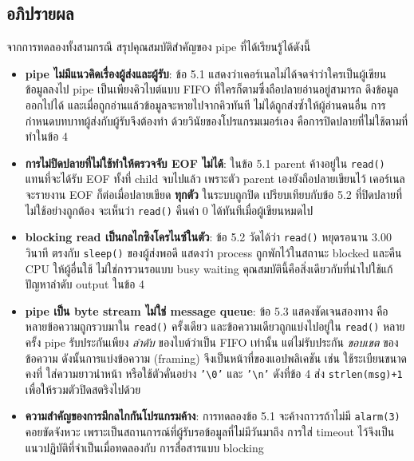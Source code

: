\documentclass[a4paper,12pt]{article}
\newcommand{\code}[1]{\texttt{#1}}
\begin{document}
\subsection{อภิปรายผล}

จากการทดลองทั้งสามกรณี สรุปคุณสมบัติสำคัญของ pipe ที่ได้เรียนรู้ได้ดังนี้

\begin{itemize}[leftmargin=*]
  \item \textbf{pipe ไม่มีแนวคิดเรื่องผู้ส่งและผู้รับ}:
        ข้อ 5.1 แสดงว่าเคอร์เนลไม่ได้จดจำว่าใครเป็นผู้เขียนข้อมูลลงไป
        pipe เป็นเพียงคิวไบต์แบบ FIFO ที่ใครก็ตามซึ่งถือปลายอ่านอยู่สามารถ
        ดึงข้อมูลออกไปได้ และเมื่อถูกอ่านแล้วข้อมูลจะหายไปจากคิวทันที
        ไม่ได้ถูกส่งซ้ำให้ผู้อ่านคนอื่น การกำหนดบทบาทผู้ส่งกับผู้รับจึงต้องทำ
        ด้วยวินัยของโปรแกรมเมอร์เอง คือการปิดปลายที่ไม่ใช้ตามที่ทำในข้อ 4

  \item \textbf{การไม่ปิดปลายที่ไม่ใช้ทำให้ตรวจจับ EOF ไม่ได้}:
        ในข้อ 5.1 parent ค้างอยู่ใน \code{read()} แทนที่จะได้รับ EOF
        ทั้งที่ child จบไปแล้ว เพราะตัว parent เองยังถือปลายเขียนไว้
        เคอร์เนลจะรายงาน EOF ก็ต่อเมื่อปลายเขียด \textbf{ทุกตัว} ในระบบถูกปิด
        เปรียบเทียบกับข้อ 5.2 ที่ปิดปลายที่ไม่ใช้อย่างถูกต้อง จะเห็นว่า
        \code{read()} คืนค่า 0 ได้ทันทีเมื่อผู้เขียนหมดไป

  \item \textbf{blocking read เป็นกลไกซิงโครไนซ์ในตัว}:
        ข้อ 5.2 วัดได้ว่า \code{read()} หยุดรอนาน 3.00 วินาที ตรงกับ
        \code{sleep()} ของผู้ส่งพอดี แสดงว่า process ถูกพักไว้ในสถานะ blocked
        และคืน CPU ให้ผู้อื่นใช้ ไม่ใช่การวนรอแบบ busy waiting
        คุณสมบัตินี้คือสิ่งเดียวกับที่นำไปใช้แก้ปัญหาลำดับ output ในข้อ 4

  \item \textbf{pipe เป็น byte stream ไม่ใช่ message queue}:
        ข้อ 5.3 แสดงชัดเจนสองทาง คือหลายข้อความถูกรวบมาใน \code{read()}
        ครั้งเดียว และข้อความเดียวถูกแบ่งไปอยู่ใน \code{read()} หลายครั้ง
        pipe รับประกันเพียง \emph{ลำดับ} ของไบต์ว่าเป็น FIFO เท่านั้น
        แต่ไม่รับประกัน \emph{ขอบเขต} ของข้อความ ดังนั้นการแบ่งข้อความ
        (framing) จึงเป็นหน้าที่ของแอปพลิเคชัน เช่น ใช้ระเบียนขนาดคงที่
        ใส่ความยาวนำหน้า หรือใช้ตัวคั่นอย่าง \code{'\textbackslash 0'}
        และ \code{'\textbackslash n'} ดังที่ข้อ 4 ส่ง \code{strlen(msg)+1}
        เพื่อให้รวมตัวปิดสตริงไปด้วย

  \item \textbf{ความสำคัญของการมีกลไกกันโปรแกรมค้าง}:
        การทดลองข้อ 5.1 จะค้างถาวรถ้าไม่มี \code{alarm(3)} คอยขัดจังหวะ
        เพราะเป็นสถานการณ์ที่ผู้รับรอข้อมูลที่ไม่มีวันมาถึง
        การใส่ timeout ไว้จึงเป็นแนวปฏิบัติที่จำเป็นเมื่อทดลองกับ
        การสื่อสารแบบ blocking
\end{itemize}
\end{document}
